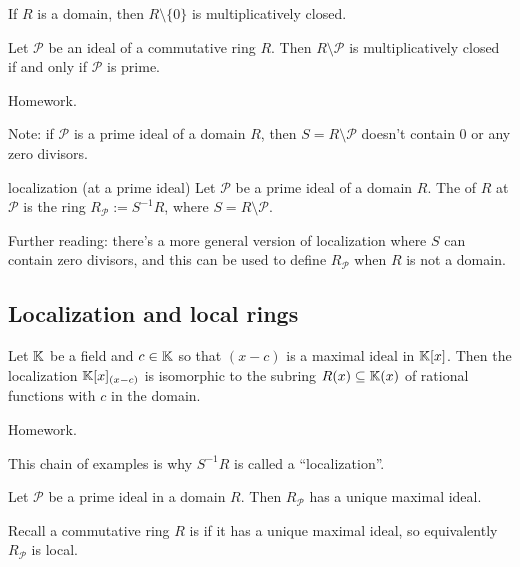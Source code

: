 \documentclass[12pt,letterpaper]{report}
\begin{document}
If $R$ is a domain, then $R \setminus \{0\}$ is multiplicatively closed.

\begin{lem}{}{}
  Let $\mathcal{P}$ be an ideal of a commutative ring $R$.
  Then $R \setminus \mathcal{P}$ is multiplicatively closed if and only if $\mathcal{P}$ is prime.
\end{lem}

\begin{thmproof}
  Homework.
\end{thmproof}

Note: if $\mathcal{P}$ is a prime ideal of a domain $R$, then $S = R \setminus \mathcal{P}$ doesn't
contain 0 or any zero divisors.

\begin{defn}{localization (at a prime ideal)}{}
  Let $\mathcal{P}$ be a prime ideal of a domain $R$.
  The  of $R$ at $\mathcal{P}$ is the ring $R_\mathcal{P} := S^{-1}R$, where
  $S = R \setminus \mathcal{P}$.
\end{defn}

Further reading: there's a more general version of localization where $S$ can contain zero divisors,
and this can be used to define $R_\mathcal{P}$ when $R$ is not a domain.

\pagebreak
\subsection{Localization and local rings}

\begin{lem}{}{}
  Let $\mathbb{K}$ be a field and $c \in \mathbb{K}$ so that $(x - c)$ is a maximal ideal in $\mathbb{K}[x]$.
  Then the localization $\mathbb{K}[x]_{(x - c)}$ is isomorphic to the subring $R(x) \subseteq \mathbb{K}(x)$ of
  rational functions with $c$ in the domain.
\end{lem}

\begin{thmproof}
  Homework.
\end{thmproof}

This chain of examples is why $S^{-1}R$ is called a ``localization''.

\begin{prop}{}{}
  Let $\mathcal{P}$ be a prime ideal in a domain $R$.
  Then $R_\mathcal{P}$ has a unique maximal ideal.
\end{prop}

Recall a commutative ring $R$ is  if it has a unique maximal ideal, so equivalently
$R_\mathcal{P}$ is local.
\end{document}
